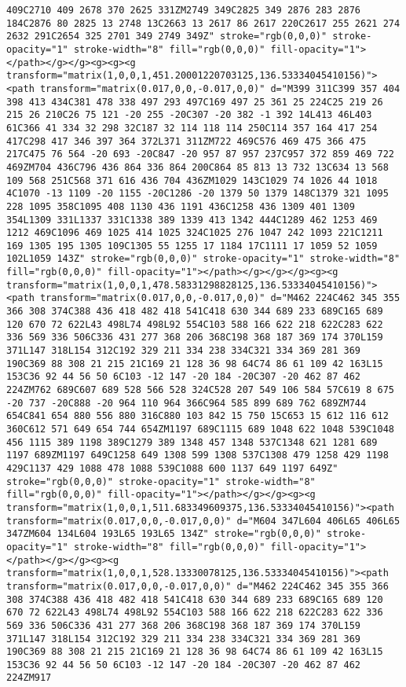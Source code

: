 \documentclass[
]{article}
\begin{document}
\begin{verbatim}
409C2710 409 2678 370 2625 331ZM2749 349C2825 349 2876 283 2876 184C2876 80 2825 13 2748 13C2663 13 2617 86 2617 220C2617 255 2621 274 2632 291C2654 325 2701 349 2749 349Z" stroke="rgb(0,0,0)" stroke-opacity="1" stroke-width="8" fill="rgb(0,0,0)" fill-opacity="1"></path></g></g><g><g><g transform="matrix(1,0,0,1,451.20001220703125,136.53334045410156)"><path transform="matrix(0.017,0,0,-0.017,0,0)" d="M399 311C399 357 404 398 413 434C381 478 338 497 293 497C169 497 25 361 25 224C25 219 26 215 26 210C26 75 121 -20 255 -20C307 -20 382 -1 392 14L413 46L403 61C366 41 334 32 298 32C187 32 114 118 114 250C114 357 164 417 254 417C298 417 346 397 364 372L371 311ZM722 469C576 469 475 366 475 217C475 76 564 -20 693 -20C847 -20 957 87 957 237C957 372 859 469 722 469ZM704 436C796 436 864 336 864 200C864 85 813 13 732 13C634 13 568 109 568 251C568 371 616 436 704 436ZM1029 143C1029 74 1026 44 1018 4C1070 -13 1109 -20 1155 -20C1286 -20 1379 50 1379 148C1379 321 1095 228 1095 358C1095 408 1130 436 1191 436C1258 436 1309 401 1309 354L1309 331L1337 331C1338 389 1339 413 1342 444C1289 462 1253 469 1212 469C1096 469 1025 414 1025 324C1025 276 1047 242 1093 221C1211 169 1305 195 1305 109C1305 55 1255 17 1184 17C1111 17 1059 52 1059 102L1059 143Z" stroke="rgb(0,0,0)" stroke-opacity="1" stroke-width="8" fill="rgb(0,0,0)" fill-opacity="1"></path></g></g></g><g><g transform="matrix(1,0,0,1,478.58331298828125,136.53334045410156)"><path transform="matrix(0.017,0,0,-0.017,0,0)" d="M462 224C462 345 355 366 308 374C388 436 418 482 418 541C418 630 344 689 233 689C165 689 120 670 72 622L43 498L74 498L92 554C103 588 166 622 218 622C283 622 336 569 336 506C336 431 277 368 206 368C198 368 187 369 174 370L159 371L147 318L154 312C192 329 211 334 238 334C321 334 369 281 369 190C369 88 308 21 215 21C169 21 128 36 98 64C74 86 61 109 42 163L15 153C36 92 44 56 50 6C103 -12 147 -20 184 -20C307 -20 462 87 462 224ZM762 689C607 689 528 566 528 324C528 207 549 106 584 57C619 8 675 -20 737 -20C888 -20 964 110 964 366C964 585 899 689 762 689ZM744 654C841 654 880 556 880 316C880 103 842 15 750 15C653 15 612 116 612 360C612 571 649 654 744 654ZM1197 689C1115 689 1048 622 1048 539C1048 456 1115 389 1198 389C1279 389 1348 457 1348 537C1348 621 1281 689 1197 689ZM1197 649C1258 649 1308 599 1308 537C1308 479 1258 429 1198 429C1137 429 1088 478 1088 539C1088 600 1137 649 1197 649Z" stroke="rgb(0,0,0)" stroke-opacity="1" stroke-width="8" fill="rgb(0,0,0)" fill-opacity="1"></path></g></g><g><g transform="matrix(1,0,0,1,511.683349609375,136.53334045410156)"><path transform="matrix(0.017,0,0,-0.017,0,0)" d="M604 347L604 406L65 406L65 347ZM604 134L604 193L65 193L65 134Z" stroke="rgb(0,0,0)" stroke-opacity="1" stroke-width="8" fill="rgb(0,0,0)" fill-opacity="1"></path></g></g><g><g transform="matrix(1,0,0,1,528.13330078125,136.53334045410156)"><path transform="matrix(0.017,0,0,-0.017,0,0)" d="M462 224C462 345 355 366 308 374C388 436 418 482 418 541C418 630 344 689 233 689C165 689 120 670 72 622L43 498L74 498L92 554C103 588 166 622 218 622C283 622 336 569 336 506C336 431 277 368 206 368C198 368 187 369 174 370L159 371L147 318L154 312C192 329 211 334 238 334C321 334 369 281 369 190C369 88 308 21 215 21C169 21 128 36 98 64C74 86 61 109 42 163L15 153C36 92 44 56 50 6C103 -12 147 -20 184 -20C307 -20 462 87 462 224ZM917 
\end{verbatim}
\end{document}
